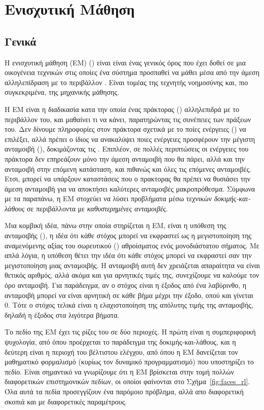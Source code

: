 \chapter{Ενισχυτική Μάθηση}
\label{chap:rl}
\section{Γενικά}

Η ενισχυτική μάθηση (ΕΜ) () είναι είναι ένας γενικός όρος που έχει
δοθεί σε μια οικογένεια τεχνικών στις οποίες ένα σύστημα προσπαθεί να μάθει μέσα από την άμεση αλληλεπίδραση
με το περιβάλλον \cite{aigreek}. Είναι τομέας της τεχνητής νοημοσύνης και, πιο συγκεκριμένα, της μηχανικής μάθησης.

H ΕΜ είναι η διαδικασία κατα την οποία ένας πράκτορας () αλληλεπιδρά με το περιβάλλον του,
και μαθαίνει τι να κάνει, παρατηρώντας τις συνέπειες των πράξεων του.
Δεν δίνουμε πληροφορίες στον πράκτορα σχετικά με το ποίες ενέργειες () να επιλέξει, αλλά πρέπει ο ίδιος να
ανακαλύψει ποιες ενέργειες προσφέρουν την μέγιστη ανταμοιβή (), δοκιμάζοντας τις \cite{rlbook}.
Επιπλέον, σε πολλές περιπτώσεις οι ενέργειες του πράκτορα δεν επηρεάζουν μόνο την άμεση ανταμοιβή που θα πάρει,
αλλά και την ανταμοιβή στην επόμενη κατάσταση, και πιθανώς και όλες τις επόμενες ανταμοιβές. Ετσι, μπορεί να υπάρξουν
καταστάσεις που ο πρακτορας θα πρέπει να θυσιάσει την άμεση ανταμοιβή για να αποκτήσει καλύτερες ανταμοιβές μακροπρόθεσμα.
Σύμφωνα με τα παραπάνω, η ΕΜ στοχεύει να λύσει προβλήματα μέσω τεχνικών
\textit{δοκιμής-και-λάθους } σε περιβάλλοντα με \textit{καθυστερημένες ανταμοιβές}.

Μια κομβική ιδέα, πάνω στην οποία στηρίζεται η ΕΜ, είναι η υπόθεση της ανταμοιβής (), η ιδέα ότι κάθε στόχος
μπορεί να εκφραστεί ως η μεγιστοποίηση της αναμενόμενης αξίας του σωρευτικού () αθροίσματος ενός μονοδιάστατου
σήματος. Με απλά λόγια, η υπόθεση θέτει την ιδέα ότι κάθε στόχος μπορεί να εκφραστεί σαν την μεγιστοποίηση μιας ανταμοιβής.
Η ανταμοιβή αυτή δεν χρειάζεται απαραίτητα να είναι θετικός αριθμός, αλλά ακόμα και για αρνητικές τιμές της, συνεχίζουμε να καλούμε
τον όρο ανταμοιβή. Για παράδειγμα, αν ο στόχος είναι η έξοδος από ένα λαβύρινθο, η ανταμοιβή μπορεί να είναι αρνητική σε κάθε βήμα
μέχρι την έξοδο, οπού και γίνεται 0. Τότε ο στόχος τελικά είναι η ελαχιστοποίηση της απόλυτης τιμής της ανταμοιβής, δηλαδή η έξοδος
στα λιγότερα βήματα.

Το πεδίο της ΕΜ έχει τις ρίζες του σε δύο περιοχές. Η πρώτη είναι η συμπεριφορική ψυχολογία, από όπου προέρχεται το
παράδειγμα της δοκιμής-και-λάθους, και η δεύτερη είναι η περιοχή του βέλτιστου ελέγχου, από όπου η ΕΜ δανείζεται
τον μαθηματικό φορμαλισμό (κυρίως τον δυναμικό προγραμματισμό) που υποστηρίζει το πεδίο. Είναι σημαντικό να γνωρίζουμε ότι η ΕΜ
βρίσκεται στην τομή πολλών διαφορετικών επιστημονικών πεδίων, οι οποίοι φαίνονται στο Σχήμα~\ref{fig:faces_rl}\cite{silver2015}.
Όλα αυτά τα πεδία προσεγγίζουν ένα παρόμοιο πρόβλημα, αλλά απο διαφορετική σκοπιά και με διαφορετικές παραμέτρους.

